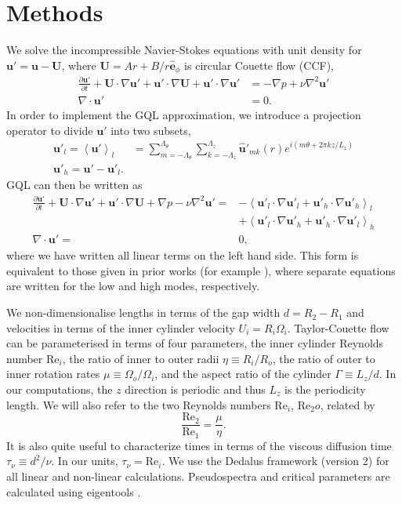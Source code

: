 \documentclass[openacc]{rstransa}%
\newcommand{\Reyn}{\mathrm{Re}}
\begin{document}
\section{Methods}
\label{sec:methods}
We solve the incompressible Navier-Stokes equations with unit density for $\mathbf{u}' = \mathbf{u} - \mathbf{U}$,
where $\mathbf{U} = A r + B/r \hat{\mathbf{e}}_\phi$ is circular Couette flow (CCF),
\begin{align}
\label{eqn:NS}
      \frac{\partial \mathbf{u'}}{\partial t} + \mathbf{U} \cdot \nabla \mathbf{u'} + \mathbf{u'} \cdot \nabla \mathbf{U} + \mathbf{u'} \cdot \nabla \mathbf{u'} &= -\nabla p + \nu \nabla^2\mathbf{u'}\\
      \nabla \cdot \mathbf{u'} &= 0.
\end{align}
In order to implement the GQL approximation, we introduce a projection operator to divide $\mathbf{u'}$ into two subsets,
\begin{align}
    \mathbf{u'}_l = \left< \mathbf{u'}\right>_l &= \sum_{m = -\Lambda_\theta}^{\Lambda_\theta} \sum_{k = -\Lambda_z}^{\Lambda_z} \mathbf{\hat{u}'}_{mk}(r) e^{i (m \theta + 2\pi k z/L_z)}\\
    \mathbf{u'}_h = \mathbf{u'} - \mathbf{u'}_l.
\end{align}
GQL can then be written as 
\begin{align}
\label{eqn:GQL}
      \frac{\partial \mathbf{u'}}{\partial t} + \mathbf{U} \cdot \nabla \mathbf{u'} + \mathbf{u'} \cdot \nabla \mathbf{U} +\nabla p - \nu \nabla^2\mathbf{u'} = &- \left<\mathbf{u'}_l \cdot \nabla \mathbf{u'}_l +\mathbf{u'}_h \cdot \nabla \mathbf{u'}_h\right>_l\\
      & +\left<\mathbf{u'}_l \cdot \nabla \mathbf{u'}_h + \mathbf{u'}_h \cdot \nabla \mathbf{u'}_l \right>_h\\
      \nabla \cdot \mathbf{u'} = & 0,
\end{align}
where we have written all linear terms on the left hand side. This form is equivalent to those given in prior works (for example \cite{2017JFM...810..412T}), where separate equations are written for the low and high modes, respectively.

We non-dimensionalise lengths in terms of the gap width $d = R_2 - R_1$ and velocities in terms of the inner cylinder velocity $U_i = R_i \Omega_i$. Taylor-Couette flow can be parameterised in terms of four parameters, the inner cylinder Reynolds number $\Reyn_i$, the ratio of inner to outer radii $\eta \equiv R_i/R_o$, the ratio of outer to inner rotation rates $\mu \equiv \Omega_o/\Omega_i$, and the aspect ratio of the cylinder $\Gamma \equiv L_z/d$. In our computations, the $z$ direction is periodic and thus $L_z$ is the periodicity length. We will also refer to the two Reynolds numbers $\Reyn_i$, $\Reyn_2o$, related by
\begin{equation}
    \frac{\Reyn_2}{\Reyn_1} = \frac{\mu}{\eta}.
\end{equation}
It is also quite useful to characterize times in terms of the viscous diffusion time $\tau_\nu \equiv d^2/\nu$. In our units, $\tau_\nu = \Reyn_i$.
We use the Dedalus framework (version 2) \cite{2020PhRvR...2b3068B} for all linear and non-linear calculations. Pseudospectra and critical parameters are calculated using eigentools \cite{2021JOSS....6.3079O}.
\end{document}

